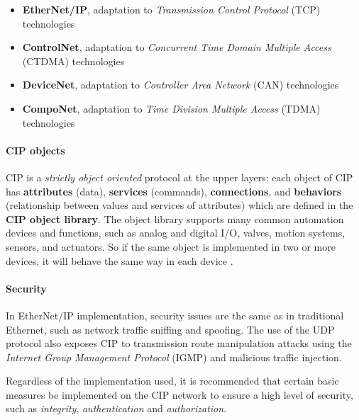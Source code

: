 \begin{itemize}
	\item \textbf{EtherNet/IP}, adaptation to \textit{Transmission Control Protocol} (TCP) technologies
	
	\item \textbf{ControlNet}, adaptation to \textit{Concurrent Time Domain Multiple Access} (CTDMA) technologies
	
	\item \textbf{DeviceNet}, adaptation to \textit{Controller Area Network} (CAN) technologies
	
	\item \textbf{CompoNet}, adaptation to \textit{Time Division Multiple Access} (TDMA) technologies
\end{itemize}

\paragraph{CIP objects} CIP is a \textit{strictly object oriented} protocol at the upper layers: each object of CIP has \textbf{attributes} (data), \textbf{services} (commands), \textbf{connections}, and \textbf{behaviors} (relationship between values and services of attributes) which are defined in the \textbf{CIP object library}. The object library supports many common automation devices and functions, such as analog and digital I/O, valves, motion systems, sensors, and actuators. So if the same object is implemented in two or more devices, it will behave the same way in each device \cite{cip_objects}.

\paragraph{Security}\cite{cip_security} In EtherNet/IP implementation, security issues are the same as in traditional Ethernet, such as network traffic sniffing and spoofing. The use of the UDP protocol also exposes CIP to transmission route manipulation attacks using the \textit{Internet Group Management Protocol} (IGMP) and malicious traffic injection.

\bigskip
Regardless of the implementation used, it is recommended that certain basic measures be implemented on the CIP network to ensure a high level of security, such as \textit{integrity}, \textit{authentication} and \textit{authorization}.

\vfill
\nolinenumbers

